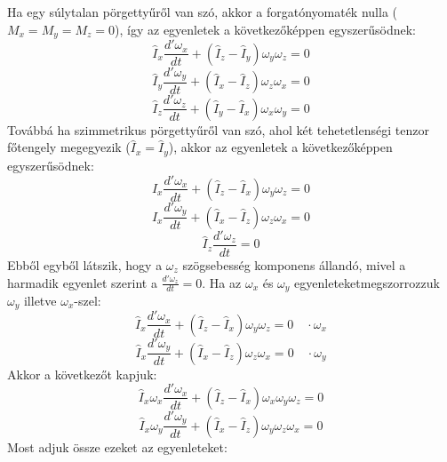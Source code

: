 \documentclass[../main.tex]{subfiles}
\begin{document}
Ha egy súlytalan pörgettyűről van szó, akkor a forgatónyomaték nulla ($M_x = M_y = M_z = 0$), így az egyenletek a következőképpen egyszerűsödnek:
\begin{equation}
    \hat{I}_x \frac{d'\omega_x}{dt} + (\hat{I}_z - \hat{I}_y) \omega_y \omega_z = 0
\end{equation}
\begin{equation}
    \hat{I}_y \frac{d'\omega_y}{dt} + (\hat{I}_x - \hat{I}_z) \omega_z \omega_x = 0
\end{equation}
\begin{equation}
    \hat{I}_z \frac{d'\omega_z}{dt} + (\hat{I}_y - \hat{I}_x) \omega_x \omega_y = 0
\end{equation}
Továbbá ha szimmetrikus pörgettyűről van szó, ahol két tehetetlenségi tenzor főtengely megegyezik ($\hat{I}_x = \hat{I}_y$), akkor az egyenletek a következőképpen egyszerűsödnek:
\begin{equation}
    \hat{I}_x \frac{d'\omega_x}{dt} + (\hat{I}_z - \hat{I}_x) \omega_y \omega_z = 0
\end{equation}
\begin{equation}
    \hat{I}_x \frac{d'\omega_y}{dt} + (\hat{I}_x - \hat{I}_z) \omega_z \omega_x = 0
\end{equation}
\begin{equation}
    \hat{I}_z \frac{d'\omega_z}{dt} = 0
\end{equation}
Ebből egyből látszik, hogy a $\omega_z$ szögsebesség komponens állandó, mivel a harmadik egyenlet szerint a $\frac{d'\omega_z}{dt} = 0$. 
Ha az $\omega_x$ és $\omega_y$ egyenleteketmegszorrozzuk $\omega_y$ illetve $\omega_x$-szel:
\begin{equation}
    \hat{I}_x \frac{d'\omega_x}{dt} + (\hat{I}_z - \hat{I}_x) \omega_y \omega_z = 0 \quad \cdot \omega_x
\end{equation}
\begin{equation}
    \hat{I}_x \frac{d'\omega_y}{dt} + (\hat{I}_x - \hat{I}_z) \omega_z \omega_x = 0 \quad \cdot \omega_y
\end{equation}
Akkor a következőt kapjuk:
\begin{equation}
    \hat{I}_x \omega_x \frac{d'\omega_x}{dt} + (\hat{I}_z - \hat{I}_x) \omega_x \omega_y \omega_z = 0
\end{equation}
\begin{equation}
    \hat{I}_x \omega_y \frac{d'\omega_y}{dt} + (\hat{I}_x - \hat{I}_z) \omega_y \omega_z \omega_x = 0
\end{equation}
Most adjuk össze ezeket az egyenleteket:
\end{document}
